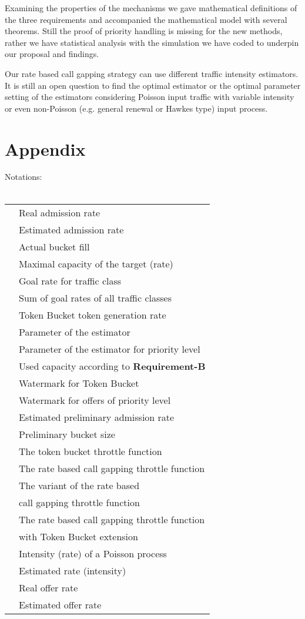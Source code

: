 \documentclass[conference]{IEEEtran}
\newcommand{\reqB}{\textbf{Requirement-B}}
\begin{document}
Examining the properties of the mechanisms we gave mathematical
definitions of the three requirements and accompanied the
mathematical model with several theorems. Still the proof of
priority handling is missing for the new methods, rather we have
statistical analysis with the simulation we have coded to underpin
our proposal and findings.

Our rate based call gapping strategy can use different traffic
intensity estimators. It is still an open question to find the
optimal estimator or the optimal parameter setting of the estimators
considering Poisson input traffic with variable intensity or even
non-Poisson (e.g. general renewal or Hawkes type) input process.


\section{Appendix}
Notations:\\
\\
\begin{tabular}{|l|l|}
  \hline
 & Real admission rate\\
   & Estimated admission rate\\
   & Actual bucket fill\\
   & Maximal capacity of the target (rate)\\
   & Goal rate for traffic class \\
   & Sum of goal rates of all traffic classes\\
   & Token Bucket token generation rate\\
   & Parameter of the estimator\\
   & Parameter of the estimator for priority level \\
   & Used capacity according to \reqB\\
   & Watermark for Token Bucket\\
   & Watermark for offers of priority level \\
   & Estimated preliminary admission rate\\
   & Preliminary bucket size \\
   & The token bucket throttle function\\
   & The rate based call gapping throttle function\\
   & The variant of the rate based\\
  & call gapping throttle function\\
   & The rate based call gapping throttle function\\
  & with Token Bucket extension\\
   & Intensity (rate) of a Poisson process\\
   & Estimated rate (intensity)\\
   & Real offer rate\\
   & Estimated offer rate\\
  \hline
\end{tabular}
\end{document}
